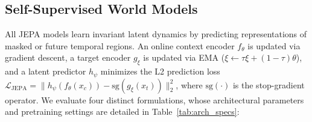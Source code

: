 \subsection{Self-Supervised World Models}

All \ac{JEPA} models learn invariant latent dynamics by predicting representations of masked or future temporal regions. An online context encoder $f_\theta$ is updated via gradient descent, a target encoder $g_\xi$ is updated via \ac{EMA} ($\xi \leftarrow \tau \xi + (1-\tau)\theta$), and a latent predictor $h_\psi$ minimizes the L2 prediction loss $\mathcal{L}_{\text{JEPA}} = \| h_\psi(f_\theta(x_c)) - \text{sg}(g_\xi(x_t)) \|_2^2$, where $\text{sg}(\cdot)$ is the stop-gradient operator. We evaluate four distinct formulations, whose architectural parameters and pretraining settings are detailed in Table~\ref{tab:arch_specs}:

